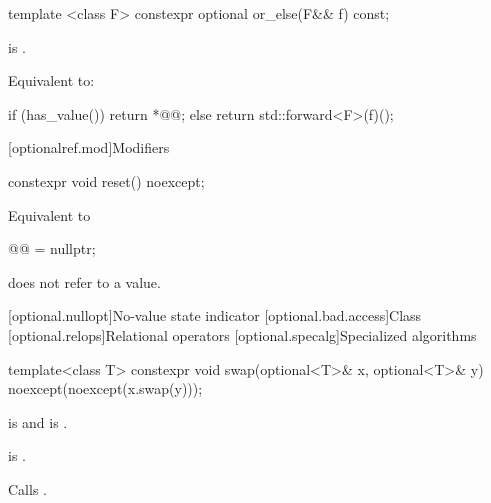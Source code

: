 \begin{addedblock}
\begin{itemdecl}
template <class F>
constexpr optional or_else(F&& f) const;
\end{itemdecl}

\begin{itemdescr}
  \pnum
  \mandates
   is .

  \pnum
  \effects
  Equivalent to:
  \begin{codeblock}
    if (has_value()) {
        return *@@;
    } else {
        return std::forward<F>(f)();
    }
  \end{codeblock}
\end{itemdescr}


[optionalref.mod]{Modifiers}

\begin{itemdecl}
constexpr void reset() noexcept;
\end{itemdecl}

\begin{itemdescr}
  \pnum
  \effects
  Equivalent to
  \begin{codeblock}
  @@ = nullptr;
  \end{codeblock}
   does not refer to a value.
\end{itemdescr}

\end{addedblock}

[optional.nullopt]{No-value state indicator}
[optional.bad.access]{Class }
[optional.relops]{Relational operators}
[optional.specalg]{Specialized algorithms}
%
\begin{itemdecl}
template<class T>
  constexpr void swap(optional<T>& x, optional<T>& y) noexcept(noexcept(x.swap(y)));
\end{itemdecl}

\begin{itemdescr}
\pnum
\begin{removedblock}
\constraints
{} is  and
 is .
\end{removedblock}

\begin{addedblock}
  \constraints
     is .
\end{addedblock}

\pnum
\effects
Calls .
\end{itemdescr}


